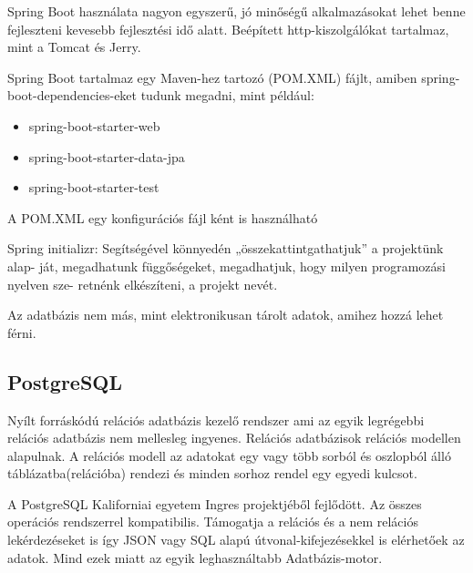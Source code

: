 Spring Boot használata nagyon egyszerű, jó minőségű alkalmazásokat lehet benne fejleszteni kevesebb fejlesztési idő alatt. Beépített http-kiszolgálókat tartalmaz, mint a Tomcat és Jerry.

Spring Boot tartalmaz egy Maven-hez tartozó (POM.XML) fájlt, amiben spring-boot-dependencies-eket tudunk megadni, mint például:

\begin{itemize}
\item spring-boot-starter-web
\item spring-boot-starter-data-jpa
\item spring-boot-starter-test
\end{itemize}

A POM.XML egy konfigurációs fájl ként is használható

Spring initializr: Segítségével könnyedén „összekattintgathatjuk” a projektünk alap-
ját, megadhatunk függőségeket, megadhatjuk, hogy milyen programozási nyelven sze-
retnénk elkészíteni, a projekt nevét. \cite{SpringBoot}

Az adatbázis nem más, mint elektronikusan tárolt adatok, amihez hozzá lehet férni.


\subsection{PostgreSQL}

Nyílt forráskódú relációs adatbázis kezelő rendszer ami az egyik legrégebbi relációs adatbázis nem mellesleg ingyenes. Relációs adatbázisok relációs modellen alapulnak. A relációs modell az adatokat egy vagy több sorból és oszlopból álló táblázatba(relációba) rendezi és minden sorhoz rendel egy egyedi kulcsot.

A PostgreSQL Kaliforniai egyetem Ingres projektjéből fejlődött. Az összes operációs rendszerrel kompatibilis. Támogatja a relációs és a nem relációs lekérdezéseket is így JSON vagy SQL alapú útvonal-kifejezésekkel is elérhetőek az adatok.  Mind ezek miatt az egyik leghasználtabb Adatbázis-motor.\cite{PostgreSQL}

